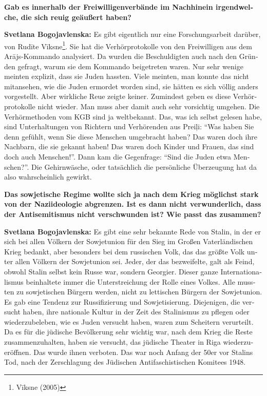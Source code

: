 \begin{otherlanguage}{ngerman}
\textbf{Gab es innerhalb der Freiwilligenverbände im Nachhinein irgendwelche, die sich reuig geäußert haben?}

\textbf{Svetlana Bogojavlenska:} Es gibt eigentlich nur eine Forschungsarbeit darüber,  von Rudīte Vīksne\footnote{Vīksne (2005)}. Sie hat die Verhörprotokolle von den Freiwilligen aus dem Arājs-Kommando analysiert. Da wurden die Beschuldigten auch nach den Gründen gefragt, warum sie dem Kommando beigetreten waren. Nur sehr wenige meinten explizit, dass sie Juden hassten. Viele meinten, man konnte das nicht mitansehen, wie die Juden ermordet worden sind, sie hätten es sich völlig anders vorgestellt. Aber wirkliche Reue zeigte keiner. Zumindest geben es diese Verhörprotokolle nicht wieder. Man muss aber damit auch sehr vorsichtig umgehen. Die Verhörmethoden vom KGB sind ja weltbekannt. Das, was ich selbst gelesen habe, sind Unterhaltungen von Richtern und Verhörenden aus Preiļi: "`Was haben Sie denn gefühlt, wenn Sie diese Menschen umgebracht haben? Das waren doch ihre Nachbarn, die sie gekannt haben! Das waren doch Kinder und Frauen, das sind doch auch Menschen!"'. Dann kam die Gegenfrage: "`Sind die Juden etwa Menschen?"'. Die Gehirnwäsche, oder tatsächlich die persönliche Überzeugung hat da also wahrscheinlich gewirkt.

\textbf{Das sowjetische Regime wollte sich ja nach dem Krieg möglichst stark von der Naziideologie abgrenzen. Ist es dann nicht verwunderlich, dass der Antisemitismus nicht verschwunden ist? Wie passt das zusammen?}

\textbf{Svetlana Bogojavlenska:} Es gibt eine sehr bekannte Rede von Stalin, in der er sich bei allen Völkern der Sowjetunion für den Sieg im Großen Vaterländischen Krieg bedankt, aber besonders bei dem russischen Volk, das das größte Volk unter allen Völkern der Sowjetunion sei. Jeder, der das bezweifelte, galt als Feind, obwohl Stalin selbst kein Russe war, sondern Georgier. Dieser ganze Internationalismus beinhaltete immer die Unterstreichung der Rolle eines Volkes. Alle mussten zu sowjetischen Bürgern werden, nicht zu lettischen Bürgern der Sowjetunion. Es gab eine Tendenz zur Russifizierung und Sowjetisierung. Diejenigen, die versucht haben, ihre nationale Kultur in der Zeit des Stalinismus zu pflegen oder wiederzubeleben, wie es Juden versucht haben, waren zum Scheitern verurteilt. Da es für die jüdische Bevölkerung sehr wichtig war, nach dem Krieg die Reste zusammenzuhalten, haben sie versucht, das jüdische Theater in Riga wiederzueröffnen. Das wurde ihnen verboten. 
Das war noch Anfang der 50er vor Stalins Tod, nach der Zerschlagung des Jüdischen Antifaschistischen Komitees 1948.


\end{otherlanguage}
